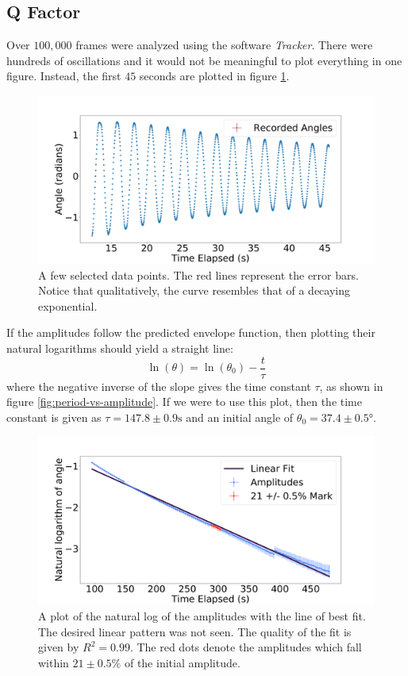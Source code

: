 \documentclass[%
 reprint,
 amsmath,amssymb
 aps,
]{revtex4-2}
\begin{document}
\subsection{Q Factor}
Over $100,000$ frames were analyzed using the software \textit{Tracker}. There were hundreds of oscillations and it would not be meaningful to plot everything in one figure. Instead, the first $45$ seconds are plotted in figure \ref{fig:intervals}.
\begin{figure}[!h]
    \includegraphics[width=\linewidth]{figures/first-1000.png}

    \caption{A few selected data points. The red lines represent the error bars. Notice that qualitatively, the curve resembles that of a decaying exponential.}
    \label{fig:intervals}
\end{figure}
If the amplitudes follow the predicted envelope function, then plotting their natural logarithms should yield a straight line:
\begin{equation}
    \ln(\theta)=\ln(\theta_0)-\frac{t}{\tau}
    \label{eq:}
\end{equation}
where the negative inverse of the slope gives the time constant $\tau$, as shown in figure \ref{fig:period-vs-amplitude}. If we were to use this plot, then the time constant is given as $\tau = 147.8 \pm 0.9 \si{\second}$ and an initial angle of $\theta_0=37.4 \pm 0.5\si{\degree}$.
\begin{figure}[!h]
    \includegraphics[width=\linewidth]{figures/amplitude-vs-time-fitted.png}

    \caption{A plot of the natural log of the amplitudes with the line of best fit. The desired linear pattern was not seen. The quality of the fit is given by $R^2=0.99$. The red dots denote the amplitudes which fall within $21 \pm 0.5\%$ of the initial amplitude.}
    \label{fig:amplitude-vs-time}
\end{figure}
\end{document}
